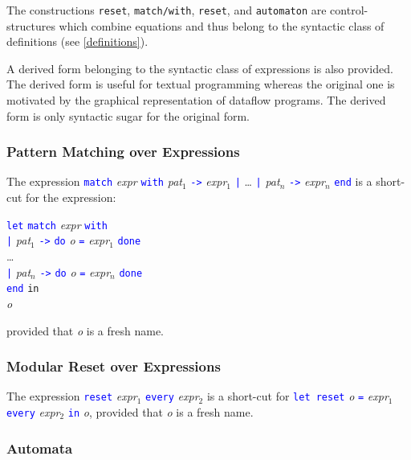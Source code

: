 \documentclass[11pt,titlepage,twoside]{report}
\makeatletter
\newcommand{\zls}[1]{{\@span{class="zelusinline"}#1}}
\newcommand{\zls}[1]{\texttt{#1}}
\renewcommand{\zls}[1]{\texttt{#1}}
\newcommand{\In}{\mbox{{\tt in}}}
\newcommand{\Minusgreater}{\mbox{{\tt ->}}}
\newcommand{\term}[1]{\textcolor{Blue}{\tt #1}}
\newcommand{\nterm}[1]{\textcolor{BrickRed}{\it #1}}
\newcommand{\term}[1]{{\tt #1}}
\newcommand{\nterm}[1]{{\em #1}}
\makeatother
\begin{document}
The constructions \zls{reset}, \zls{match/with}, \zls{reset}, and
\zls{automaton} are control-structures which combine equations and
thus belong to the syntactic class of definitions (see
\cref{definitions}).

A derived form belonging to the syntactic class of expressions is also
provided. The derived form is useful for textual programming whereas
the original one is motivated by the graphical representation of
dataflow programs. The derived form is only syntactic sugar for the
original form.

\subsubsection{Pattern Matching over Expressions} %

The expression
\term{match} \nterm{expr} \term{with} 
  \nterm{pat}$_1$ \term{\Minusgreater} \nterm{expr}$_1$ \term{|} \dots 
\term{|} \nterm{pat}$_n$ \term{\Minusgreater} \nterm{expr}$_n$ \term{end}
is a short-cut for the expression:

\begin{center}
\begin{tabbing}
\term{let} \= \term{match} \nterm{expr} \term{with} \\ 
           \> \term{|} \nterm{pat}$_1$ \term{\Minusgreater} 
               \term{do} \nterm{o} \term{=} \nterm{expr}$_1$ \term{done} \\
           \> \dots \\
           \> \term{|} \nterm{pat}$_n$ \term{\Minusgreater} 
               \term{do} \nterm{o} \term{=} \nterm{expr}$_n$ \term{done} \\
           \> \term{end} \In \\
\nterm{o}
\end{tabbing}
\end{center}
provided that \nterm{o} is a fresh name.

\subsubsection{Modular Reset over Expressions} %

The expression \term{reset} \nterm{expr}$_1$ \term{every} \nterm{expr}$_2$
is a short-cut for
\term{let reset} \nterm{o} \term{=} \nterm{expr}$_1$ 
\term{every} \nterm{expr}$_2$ \term{in} \nterm{o},
provided that \nterm{o} is a fresh name.

\subsubsection{Automata} %
\end{document}
